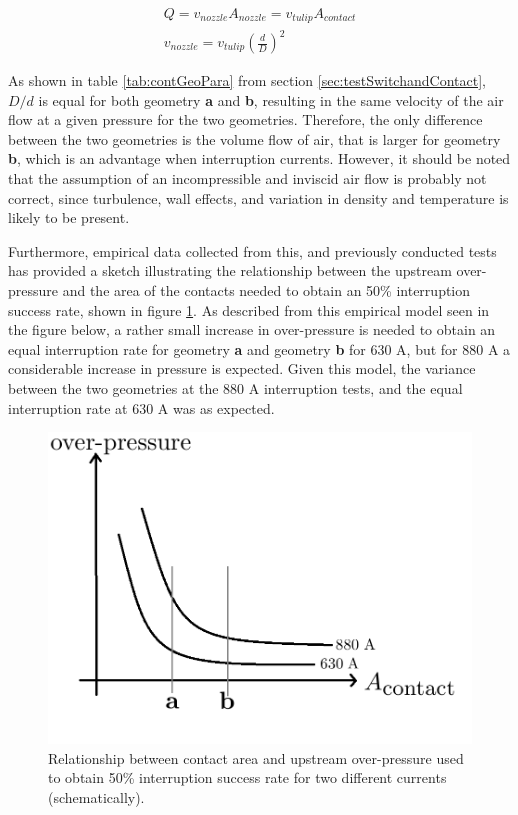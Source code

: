 \documentclass[10pt,b5paper,twoside]{article}
\begin{document}
\begin{equation} \label{nozzle_speed}
\begin{split}
Q=v_{nozzle} A_{nozzle}=v_{tulip} A_{contact} \\
v_{nozzle}=v_{tulip} \left( \frac{d}{D} \right) ^2 \ \ \ \ \ \ \ \ \
\end{split}
\end{equation} 

As shown in table \ref{tab:contGeoPara} from section \ref{sec:testSwitchandContact}, $D/d$ is equal for both geometry \textbf{a} and \textbf{b}, resulting in the same velocity of the air flow at a given pressure for the two geometries. Therefore, the only difference between the two geometries is the volume flow of air, that is larger for geometry \textbf{b}, which is an advantage when interruption currents. However, it should be noted that the assumption of an incompressible and inviscid air flow is probably not correct, since turbulence, wall effects, and variation in density and temperature is likely to be present.

Furthermore, empirical data collected from this, and previously conducted tests has provided a sketch illustrating the relationship between the upstream over-pressure and the area of the contacts needed to obtain an 50\% interruption success rate, shown in figure \ref{fig:sketch50Intrate}. As described from this empirical model seen in the figure below, a rather small increase in over-pressure is needed to obtain an equal interruption rate for geometry \textbf{a} and geometry \textbf{b} for 630 A, but for 880 A a considerable increase in pressure is expected. Given this model, the variance between the two geometries at the 880 A interruption tests, and the equal interruption rate at 630 A was as expected.

\begin{figure}[H]
\centering
\includegraphics[scale=0.45]{Bilder/Results/pressureVSAcontact2.png}
\caption{Relationship between contact area and upstream over-pressure used to obtain 50\% interruption success rate for two different currents (schematically).} \label{fig:sketch50Intrate}
\end{figure}
\end{document}
